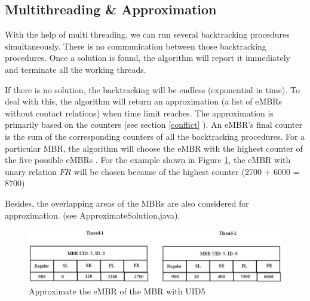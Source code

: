 \documentclass{article}
\begin{document}
\subsection{Multithreading \& Approximation}
With the help of multi threading, we can run several backtracking procedures simultaneously. There is no communication between those backtracking procedures. Once a solution is found, the algorithm will report it immediately and terminate all the working threads.

If there is no solution, the backtracking will be endless (exponential in time). To deal with this, the algorithm will return an approximation (a list of eMBRs without contact relations) when time limit reaches. The approximation is primarily based on the counters (see section \ref{conflict} ). An eMBR's final counter is the sum of the corresponding counters of all the backtracking procedures. For a particular MBR, the algorithm will choose the eMBR with the highest counter of the five possible eMBRs . For the example shown in Figure \ref{example}, the eMBR with unary relation $FR$ will be chosen because of the highest counter (2700 + 6000 = 8700) 

Besides, the overlapping areas of the MBRs are also considered for approximation. (see ApproximateSolution.java).   	

\begin{figure}[h!]
\centering\includegraphics[scale=0.35]{f2.jpg}\caption{Approximate the eMBR of the MBR with UID5 }
\label{example}
\end{figure}
\end{document}
